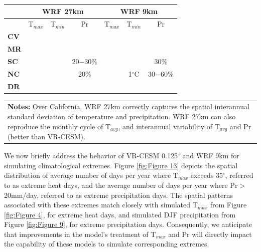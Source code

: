 \begin{table}
\begin{center}
\begin{tabular*}{5.5in}{l @{\extracolsep{\fill}}cccccc}
\hline \textbf{} & \multicolumn{3}{c}{\textbf{WRF 27km}} & \multicolumn{3}{c}{\textbf{WRF 9km}} \\
\hline & T$_{max}$ & T$_{min}$ & Pr & T$_{max}$ & T$_{min}$ & Pr  \\
\hline \textbf{CV} & \cellcolor{red!60}{2$-$3$^\circ$C} & \cellcolor{blue!30}{1$^\circ$C} & \cellcolor{black!20} & \cellcolor{red!30}{1$-$2$^\circ$C}  & \cellcolor{black!20} & \cellcolor{red!60}{50$-$70$\%$} \\

\hline \textbf{MR} &  \cellcolor{blue!60}{2$^\circ$C} & \cellcolor{red!60}{2$^\circ$C} & \cellcolor{black!20} & \cellcolor{blue!60}{3$-$4$^\circ$C}  & \cellcolor{red!60}{2$^\circ$C} &  \cellcolor{red!60}{70$-$100$\%$}  \\

\hline \textbf{SC} &   \cellcolor{blue!60}{2$^\circ$C} & \cellcolor{red!30}{1$^\circ$C}  & \cellcolor{blue!30}20$-$30$\%$  &  \cellcolor{blue!60}{2$^\circ$C} & \cellcolor{red!30}{1$^\circ$C}  & \cellcolor{red!30}30$\%$ \\

\hline \textbf{NC} & \cellcolor{blue!60}{2$-$4$^\circ$C} & \cellcolor{black!20} & \cellcolor{blue!30}20$\%$ & \cellcolor{blue!60}{2$-$4$^\circ$C} & \cellcolor{red!30}1$^\circ$C & \cellcolor{red!60}30$-$60$\%$ \\

\hline \textbf{DR} & \cellcolor{black!20} & \cellcolor{black!20}  &  \cellcolor{blue!30}{20$-$40$\%$} & \cellcolor{blue!60}{2$-$3$^\circ$C} & \cellcolor{red!60}{2$^\circ$C}  &  \cellcolor{black!20} \\

\hline
\end{tabular*}

\begin{tabular}{p{6in}}
\small\textbf{Notes:} Over California, WRF 27km correctly captures the spatial interannual standard deviation of temperature and precipitation. WRF 27km can also reproduce the monthly cycle of T$_{avg}$, and interannual variability of T$_{avg}$ and Pr (better than VR-CESM).
\end{tabular}

\end{center}
\end{table}

We now briefly address the behavior of VR-CESM 0.125$^\circ$ and WRF 9km for simulating climatological extremes.  Figure \ref{fig:Figure 13} depicts the spatial distribution of average number of days per year where T$_{max}$ exceeds 35$^\circ$, referred to as extreme heat days, and the average number of days per year where Pr$>$20mm/day, referred to as extreme precipitation days.  The spatial patterns associated with these extremes match closely with simulated T$_{max}$ from Figure \ref{fig:Figure 4}, for extreme heat days, and simulated DJF precipitation from Figure \ref{fig:Figure 9}, for extreme precipitation days.  Consequently, we anticipate that improvements in the model's treatment of T$_{max}$ and Pr will directly impact the capability of these models to simulate corresponding extremes.

